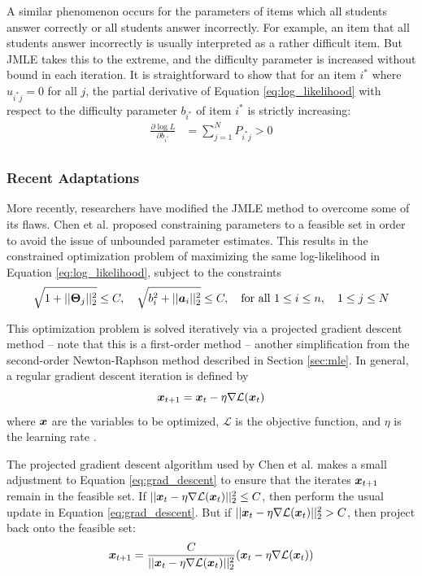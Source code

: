 A similar phenomenon occurs for the parameters of items which all students answer correctly or all students answer incorrectly. For example, an item that all students answer incorrectly is usually interpreted as a rather difficult item. But JMLE takes this to the extreme, and the difficulty parameter is increased without bound in each iteration. It is straightforward to show that for an item $i^*$ where $u_{i^*j} = 0$ for all $j$, the partial derivative of Equation \ref{eq:log_likelihood} with respect to the difficulty parameter $b_{i^*}$ of item $i^*$ is strictly increasing:
\begin{equation}
  \begin{split}
  \frac{\partial \log L}{\partial b_{i^*}} &= \sum_{j=1}^N P_{i^*j}  > 0 \\
  \end{split}
  \label{eq:diff_item_partial}
\end{equation}

\subsubsection{Recent Adaptations}
More recently, researchers have modified the JMLE method to overcome some of its flaws. Chen et al. \cite{chen2019} proposed constraining parameters to a feasible set in order to avoid the issue of unbounded parameter estimates. This results in the constrained optimization problem of maximizing the same log-likelihood in Equation \ref{eq:log_likelihood}, subject to the constraints
\begin{equation}
  \sqrt{1 + ||\boldsymbol{\Theta}_j||_2^2} \leq C, \quad \sqrt{b_i^2 + ||\boldsymbol{a}_i||_2^2} \leq C, \quad \text{for all } 1\leq i \leq n, \quad 1 \leq j \leq N
  \label{eq:cjmle_constraints}
\end{equation}

This optimization problem is solved iteratively via a projected gradient descent method -- note that this is a first-order method -- another simplification from the second-order Newton-Raphson method described in Section \ref{sec:mle}. In general, a regular gradient descent iteration is defined by
\begin{equation}
  \boldsymbol{x}_{t+1} = \boldsymbol{x}_t - \eta \nabla \mathcal{L}(\boldsymbol{x}_t)
  \label{eq:grad_descent}
\end{equation}
where $\boldsymbol{x}$ are the variables to be optimized, $\mathcal{L}$ is the objective function, and $\eta$ is the learning rate \cite{ruder2017}.

The projected gradient descent algorithm used by Chen et al. makes a small adjustment to Equation \ref{eq:grad_descent} to ensure that the iterates $\boldsymbol{x}_{t+1}$ remain in the feasible set. If $||\boldsymbol{x}_t - \eta \nabla \mathcal{L}(\boldsymbol{x}_t)||_2^2 \leq C$, then perform the usual update in Equation \ref{eq:grad_descent}. But if $||\boldsymbol{x}_t - \eta \nabla \mathcal{L}(\boldsymbol{x}_t)||_2^2 > C$, then project back onto the feasible set:
\begin{equation}
  \boldsymbol{x}_{t+1} = \frac{C}{||\boldsymbol{x}_t - \eta \nabla \mathcal{L}(\boldsymbol{x}_t)||_2^2} (\boldsymbol{x}_t - \eta \nabla \mathcal{L}(\boldsymbol{x}_t))
  \label{eq:proj_grad_descent}
\end{equation}

